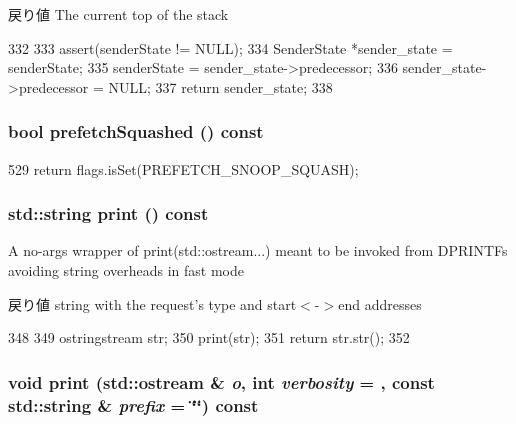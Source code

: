\begin{DoxyReturn}{戻り値}
The current top of the stack 
\end{DoxyReturn}



\begin{DoxyCode}
332 {
333     assert(senderState != NULL);
334     SenderState *sender_state = senderState;
335     senderState = sender_state->predecessor;
336     sender_state->predecessor = NULL;
337     return sender_state;
338 }
\end{DoxyCode}
\hypertarget{classPacket_a142c7ae41f822269b145818af682f031}{
\subsubsection[{prefetchSquashed}]{\setlength{\rightskip}{0pt plus 5cm}bool prefetchSquashed () const}}
\label{classPacket_a142c7ae41f822269b145818af682f031}



\begin{DoxyCode}
529 { return flags.isSet(PREFETCH_SNOOP_SQUASH); }
\end{DoxyCode}
\hypertarget{classPacket_ae8a5b5e9e0e6be3b115ee77fa7b4d0c8}{
\subsubsection[{print}]{\setlength{\rightskip}{0pt plus 5cm}std::string print () const}}
\label{classPacket_ae8a5b5e9e0e6be3b115ee77fa7b4d0c8}
A no-\/args wrapper of print(std::ostream...) meant to be invoked from DPRINTFs avoiding string overheads in fast mode \begin{DoxyReturn}{戻り値}
string with the request's type and start$<$-\/$>$end addresses 
\end{DoxyReturn}



\begin{DoxyCode}
348                     {
349     ostringstream str;
350     print(str);
351     return str.str();
352 }
\end{DoxyCode}
\hypertarget{classPacket_ae31e5ec0b459f751b386d17dd75855d1}{
\subsubsection[{print}]{\setlength{\rightskip}{0pt plus 5cm}void print (std::ostream \& {\em o}, \/  int {\em verbosity} = {}, \/  const std::string \& {\em prefix} = {\ttfamily \char`\"{}\char`\"{}}) const}}
\label{classPacket_ae31e5ec0b459f751b386d17dd75855d1}


